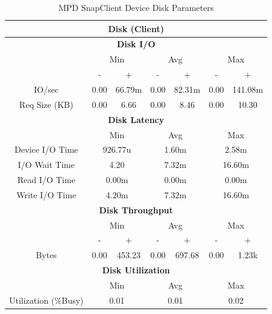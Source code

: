 \documentclass[11pt,a4paper,headinclude=false,footinclude=false]{scrreprt}
\begin{document}
\begin{table}[H]
\centering
    \begin{tabular}{||c|c|c|c|c|c|c||}
    \hline
    \multicolumn{7}{|c|}{\textbf{Disk (Client)}} \\
    \hline
    \multicolumn{7}{|c|}{\textbf{Disk I/O}} \\
    \hline\hline
      & \multicolumn{2}{|c|}{Min} & \multicolumn{2}{|c|}{Avg} & \multicolumn{2}{|c|}{Max} \\
    \hline
      & - & + & - & + & - & + \\
    \hline
    IO/sec & 0.00 & 66.79m & 0.00 & 82.31m & 0.00 & 141.08m \\
    \hline
    Req Size (KB) & 0.00 & 6.66 & 0.00 & 8.46 & 0.00 & 10.30 \\
    \hline\hline
    \multicolumn{7}{|c|}{\textbf{Disk Latency}} \\
    \hline\hline
      & \multicolumn{2}{|c|}{Min} & \multicolumn{2}{|c|}{Avg} & \multicolumn{2}{|c|}{Max} \\
    \hline
    Device I/O Time  & \multicolumn{2}{|c|}{926.77u} & \multicolumn{2}{|c|}{1.60m} & \multicolumn{2}{|c|}{2.58m} \\
    \hline
    I/O Wait Time  & \multicolumn{2}{|c|}{4.20} & \multicolumn{2}{|c|}{7.32m} & \multicolumn{2}{|c|}{16.60m} \\
    \hline
    Read I/O Time  & \multicolumn{2}{|c|}{0.00m} & \multicolumn{2}{|c|}{0.00m} & \multicolumn{2}{|c|}{0.00m} \\
    \hline
    Write I/O Time  & \multicolumn{2}{|c|}{4.20m} & \multicolumn{2}{|c|}{7.32m} & \multicolumn{2}{|c|}{16.60m} \\
    \hline\hline
    \multicolumn{7}{|c|}{\textbf{Disk Throughput}} \\
    \hline\hline
      & \multicolumn{2}{|c|}{Min} & \multicolumn{2}{|c|}{Avg} & \multicolumn{2}{|c|}{Max} \\
    \hline
      & - & + & - & + & - & + \\
    \hline
    Bytes & 0.00 & 453.23 & 0.00 & 697.68 & 0.00 & 1.23k \\
    \hline\hline
    \multicolumn{7}{|c|}{\textbf{Disk Utilization}} \\
    \hline\hline
      & \multicolumn{2}{|c|}{Min} & \multicolumn{2}{|c|}{Avg} & \multicolumn{2}{|c|}{Max} \\
    \hline
    Utilization (\%Busy)  & \multicolumn{2}{|c|}{0.01} & \multicolumn{2}{|c|}{0.01} & \multicolumn{2}{|c|}{0.02} \\
    \hline\hline
    \end{tabular}
    \caption{MPD SnapClient Device Disk Parameters}
    \label{MPDclientDiskTab}
\end{table}
\end{document}
